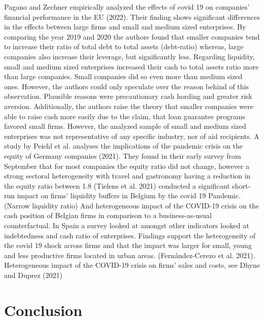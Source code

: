 Pagano and Zechner empirically analyzed the effects of covid 19 on companies’ financial performance in the EU (2022). Their finding shows significant differences in the effects between large firms and small and medium sized enterprises. 
By comparing the year 2019 and 2020 the authors found that smaller companies tend to increase their ratio of total debt to total assets (debt-ratio) whereas, large companies also increase their leverage, but significantly less.
Regarding liquidity, small and medium sized enterprises increased their cash to total assets ratio more than large companies. Small companies did so even more than medium sized ones. However, the authors could only speculate over the reason behind of this observation. Plausible reasons were precautionary cash hording and greater risk aversion. Additionally, the authors raise the theory that smaller companies were able to raise cash more easily due to the claim, that loan guarantee programs favored small firms. However, the analyzed sample of small and medium sized enterprises was not representative of any specific industry, nor of aid recipients. 
A study by Peichl et al. analyses the implications of the pandemic crisis on the equity of Germany companies (2021). They found in their early survey from September that for most companies the equity ratio did not change, however a strong sectoral heterogeneity with travel and gastronomy having a reduction in the equity ratio between 1.8 %
(Tielens et al. 2021) conducted a significant short-run impact on firms’ liquidity buffers in Belgium by the covid 19 Pandemic. (Narrow liquidity ratio) And heterogeneous impact of the COVID-19 crisis on the cash position of Belgian firms in comparison to a business-as-usual counterfactual.
In Spain a survey looked at amongst other indicators looked at indebtedness and cash ratio of enterprises. Findings support the heterogeneity of the covid 19 shock across firms and that the impact was larger for small, young and less productive firms located in urban areas. (Fernández-Cerezo et al. 2021).
Heterogeneous impact of the COVID-19 crisis on firms’ sales and costs, see Dhyne and Duprez (2021)





\section{Conclusion}

